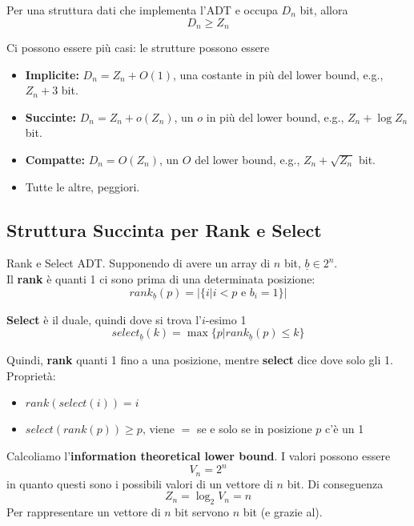 Per una struttura dati che implementa l'ADT e occupa $D_n$ bit, allora 
$$ D_n \geq Z_n$$

Ci possono essere più casi: le strutture possono essere
\begin{itemize}
	\item \textbf{Implicite:} $D_n = Z_n + O(1)$, una costante in più del lower bound, e.g., $Z_n + 3$ bit.\\
	
	\item \textbf{Succinte:} $D_n = Z_n + o(Z_n)$, un $o$ in più del lower bound, e.g., $Z_n + \log Z_n$ bit.\\
	
	\item \textbf{Compatte:} $D_n = O(Z_n)$, un $O$ del lower bound, e.g., $Z_n + \sqrt{Z_n}$ bit.\\
	
	\item Tutte le altre, peggiori.\\
\end{itemize}

\newpage

\subsection{Struttura Succinta per Rank e Select}

Rank e Select ADT. Supponendo di avere un array di $n$ bit, $\underline b \in 2^n$.\\

Il \textbf{rank} è quanti 1 ci sono prima di una determinata posizione: 
$$ rank_{\underline b} (p) = |\{i | i<p \text{ e } b_i = 1\}| $$

\textbf{Select} è il duale, quindi dove si trova l'$i$-esimo 1 
$$ select_{\underline b} (k) = \max \{p | rank_{\underline b} (p) \leq k \}$$

Quindi, \textbf{rank} quanti 1 fino a una posizione, mentre \textbf{select} dice dove solo gli 1.\\

Proprietà:
\begin{itemize}
	\item $rank(select(i)) = i$
	\item $select(rank(p)) \geq p$, viene $=$ se e solo se in posizione $p$ c'è un 1
\end{itemize}

Calcoliamo l'\textbf{information theoretical lower bound}. I valori possono essere 
$$ V_n = 2^n $$
in quanto questi sono i possibili valori di un vettore di $n$ bit. Di conseguenza 
$$ Z_n = \log_2 V_n = n $$
Per rappresentare un vettore di $n$ bit servono $n$ bit (e grazie al).\\

